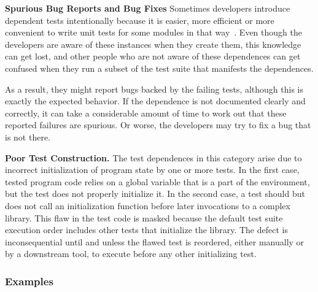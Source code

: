 \vspace{1mm}

\noindent \textbf{Spurious Bug Reports and Bug Fixes}
Sometimes developers introduce dependent tests intentionally because it is
easier, more efficient or more convenient to write unit tests for some modules
in that way~\cite{kapfhammeretal:FSE:2003, whittakeretal:2012}.
Even though the developers are aware of these instances
when they create them, this knowledge can get lost, 
and other people who are not aware of these dependences can get confused 
when they run a subset of the test suite that manifests the
dependences.

As a result, they
might report bugs backed by the failing tests, although this is exactly the expected
behavior. If the dependence is not documented clearly and
correctly, it can take a considerable amount of time to work out that
these reported failures are spurious. Or worse, the developers may try
to fix a bug that is not there.


\vspace{1mm}

\noindent \textbf{Poor Test Construction.}
The test dependences in this category arise due to incorrect initialization
of program state by one or more tests. In the first case,
tested program code relies on a
global variable that is a part of the environment, but the test does
not properly initialize it.  In the second case, a test should but
does not call
an initialization function before later invocations to a complex library.
This flaw in the test code is masked because the default test suite execution
order includes other tests that initialize the library.  The defect is
inconsequential until and unless the flawed test is reordered, either manually or by
a downstream tool, to execute before any other initializing test.


\subsubsection{Examples}
\label{sec:examples}



